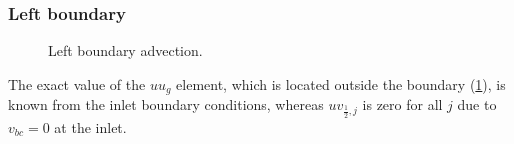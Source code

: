 \documentclass{article}
\numberwithin{equation}{section}
\begin{document}
\subsubsection{Left boundary}\label{subsubsec:advection-left}
\begin{figure}[H] %
  \caption{Left boundary advection.}\label{fig:ADV-left}
\end{figure}
The exact value of the $uu_g$ element, which is located outside the boundary (\cref{fig:ADV-left}), is known from the inlet boundary conditions, whereas $uv_{\frac{1}{2},j}$ is zero for all $j$ due to $v_{bc}=0$ at the inlet. 
\end{document}
